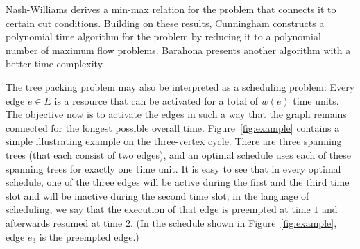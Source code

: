 Nash-Williams \cite{Nash-Williams1961} derives a min-max relation for the problem that connects it to certain cut conditions.
Building on these results, Cunningham \cite{Cunningham1985} constructs a polynomial time 
algorithm for the problem by reducing it to a polynomial number of maximum flow problems.
Barahona \cite{Barahona1995} presents another algorithm with a better time complexity.

The tree packing problem may also be interpreted as a scheduling problem:
Every edge $e\in E$ is a resource that can be activated for a total of $w(e)$ time units.
The objective now is to activate the edges in such a way that the graph remains connected 
for the longest possible overall time. 
Figure~\ref{fig:example} contains a simple illustrating example on the three-vertex cycle.
There are three spanning trees (that each consist of two edges), and an optimal schedule 
uses each of these spanning trees for exactly one time unit.
It is easy to see that in every optimal schedule, one of the three edges will be active 
during the first and the third time slot and will be inactive during the second time slot;
in the language of scheduling, we say that the execution of that edge is preempted 
at time $1$ and afterwards resumed at time $2$.
(In the schedule shown in Figure~\ref{fig:example}, edge $e_3$ is the preempted edge.)

